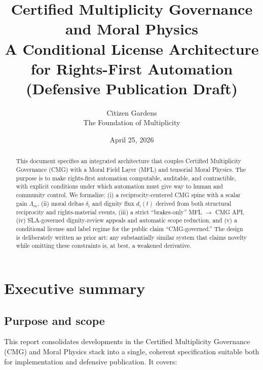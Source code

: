 \documentclass[11pt]{article}
\title{%
Certified Multiplicity Governance and Moral Physics\\
\large A Conditional License Architecture for Rights-First Automation\\
\large (Defensive Publication Draft)
}
\author[1]{Citizen Gardens \\ The Foundation of Multiplicity}
\date{April 25, 2026}
\begin{document}
\maketitle

\begin{abstract}
This document specifies an integrated architecture that couples Certified Multiplicity Governance (CMG) with a Moral Field Layer (MFL) and tensorial Moral Physics.
The purpose is to make rights-first automation computable, auditable, and contractible, with explicit conditions under which automation must give way to human and community control.
We formalize: (i) a reciprocity-centered CMG spine with a scalar gain \(\Lambda_m\), (ii) moral deltas \(\delta_i\) and dignity flux \(d_i(t)\) derived from both structural reciprocity and rights-material events, (iii) a strict ``brakes-only'' MFL \(\rightarrow\) CMG API, (iv) SLA-governed dignity-review appeals and automatic scope reduction, and (v) a conditional license and label regime for the public claim ``CMG-governed.''
The design is deliberately written as prior art: any substantially similar system that claims novelty while omitting these constraints is, at best, a weakened derivative.
\end{abstract}
\newpage
\tableofcontents

\section{Executive summary}

\subsection{Purpose and scope}

This report consolidates developments in the Certified Multiplicity Governance (CMG) and Moral Physics stack into a single, coherent specification suitable both for implementation and defensive publication.
It covers:
\end{document}

